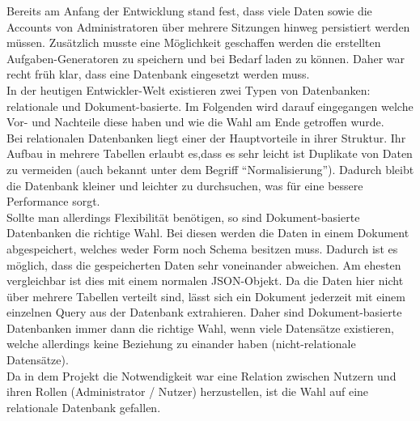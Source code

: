Bereits am Anfang der Entwicklung stand fest, dass viele Daten sowie die Accounts von Administratoren über mehrere Sitzungen hinweg persistiert werden müssen. Zusätzlich musste eine Möglichkeit geschaffen werden die erstellten Aufgaben-Generatoren zu speichern und bei Bedarf laden zu können. Daher war recht früh klar, dass eine Datenbank eingesetzt werden muss. \\

In der heutigen Entwickler-Welt existieren zwei Typen von Datenbanken: relationale und Dokument-basierte. Im Folgenden wird darauf eingegangen welche Vor- und Nachteile diese haben und wie die Wahl am Ende getroffen wurde.\\
Bei relationalen Datenbanken liegt einer der Hauptvorteile in ihrer Struktur. Ihr Aufbau in mehrere Tabellen erlaubt es,dass es sehr leicht ist Duplikate von Daten zu vermeiden (auch bekannt unter dem Begriff ``Normalisierung''). Dadurch bleibt die Datenbank kleiner und leichter zu durchsuchen, was für eine bessere Performance sorgt. \\

Sollte man allerdings Flexibilität benötigen, so sind Dokument-basierte Datenbanken die richtige Wahl. Bei diesen werden die Daten in einem Dokument abgespeichert, welches weder Form noch Schema besitzen muss. Dadurch ist es möglich, dass die gespeicherten Daten sehr voneinander abweichen. Am ehesten vergleichbar ist dies mit einem normalen JSON-Objekt. Da die Daten hier nicht über mehrere Tabellen verteilt sind, lässt sich ein Dokument jederzeit mit einem einzelnen Query aus der Datenbank extrahieren. Daher sind Dokument-basierte Datenbanken immer dann die richtige Wahl, wenn viele Datensätze existieren, welche allerdings keine Beziehung zu einander haben (nicht-relationale Datensätze). \\

Da in dem Projekt die Notwendigkeit war eine Relation zwischen Nutzern und ihren Rollen (Administrator / Nutzer) herzustellen, ist die Wahl auf eine relationale Datenbank gefallen. \\

